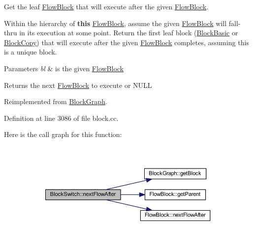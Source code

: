 Get the leaf \mbox{\hyperlink{class_flow_block}{Flow\+Block}} that will execute after the given \mbox{\hyperlink{class_flow_block}{Flow\+Block}}. 

Within the hierarchy of {\bfseries{this}} \mbox{\hyperlink{class_flow_block}{Flow\+Block}}, assume the given \mbox{\hyperlink{class_flow_block}{Flow\+Block}} will fall-\/thru in its execution at some point. Return the first leaf block (\mbox{\hyperlink{class_block_basic}{Block\+Basic}} or \mbox{\hyperlink{class_block_copy}{Block\+Copy}}) that will execute after the given \mbox{\hyperlink{class_flow_block}{Flow\+Block}} completes, assuming this is a unique block. 
\begin{DoxyParams}{Parameters}
{\em bl} & is the given \mbox{\hyperlink{class_flow_block}{Flow\+Block}} \\
\hline
\end{DoxyParams}
\begin{DoxyReturn}{Returns}
the next \mbox{\hyperlink{class_flow_block}{Flow\+Block}} to execute or N\+U\+LL 
\end{DoxyReturn}


Reimplemented from \mbox{\hyperlink{class_block_graph_aba0d42cf572bdcf2bca44d22fad971f6}{Block\+Graph}}.



Definition at line 3086 of file block.\+cc.

Here is the call graph for this function\+:
\nopagebreak
\begin{figure}[H]
\begin{center}
\leavevmode
\includegraphics[width=350pt]{class_block_switch_ae13e717fc62265c1f9b5024cb0e9cd1a_cgraph}
\end{center}
\end{figure}
\mbox{\label{class_block_switch_a3413057234f7606357b6037a516627a6}} 
